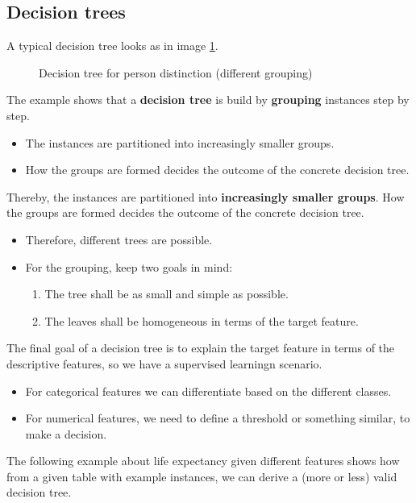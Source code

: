 \subsection{Decision trees}

A typical decision tree looks as in image \ref{fig:3_tree_example}.

\begin{figure}[h]
  \centering
  \caption{Decision tree for person distinction (different grouping)}
  \label{fig:3_tree_example}
\end{figure}

The example shows that a \textbf{decision tree} is build by \textbf{grouping} instances step by step. 
\begin{itemize}
  \item The instances are partitioned into increasingly smaller groups.
  \item How the groups are formed decides the outcome of the concrete decision tree. 
\end{itemize}Thereby, the instances are partitioned into \textbf{increasingly smaller groups}. How the groups are formed decides the outcome of the concrete decision tree.
\begin{itemize}
  \item Therefore, different trees are possible.
  \item For the grouping, keep two goals in mind:
  \begin{enumerate}
    \item The tree shall be as small and simple as possible.
    \item The leaves shall be homogeneous in terms of the target feature.
  \end{enumerate}
\end{itemize}

The final goal of a decision tree is to explain the target feature in terms of the descriptive features, so we have a supervised learningn scenario.
\begin{itemize}
  \item For categorical features we can differentiate based on the different classes.
  \item For numerical features, we need to define a threshold or something similar, to make a decision.
\end{itemize}

The following example about life expectancy given different features shows how from a given table with example instances, we can derive a (more or less) valid decision tree.

